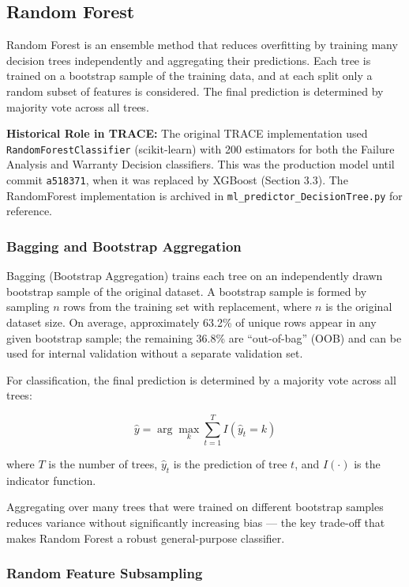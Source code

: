 \documentclass[10pt]{article}
\begin{document}
\subsection{Random Forest}

Random Forest is an ensemble method that reduces overfitting by training many decision trees independently and aggregating their predictions. Each tree is trained on a bootstrap sample of the training data, and at each split only a random subset of features is considered. The final prediction is determined by majority vote across all trees.

\textbf{Historical Role in TRACE:} The original TRACE implementation used \texttt{RandomForestClassifier} (scikit-learn) with 200 estimators for both the Failure Analysis and Warranty Decision classifiers. This was the production model until commit \texttt{a518371}, when it was replaced by XGBoost (Section 3.3). The RandomForest implementation is archived in \texttt{ml\_predictor\_DecisionTree.py} for reference.

\subsubsection{Bagging and Bootstrap Aggregation}

Bagging (Bootstrap Aggregation) trains each tree on an independently drawn bootstrap sample of the original dataset. A bootstrap sample is formed by sampling \(n\) rows from the training set with replacement, where \(n\) is the original dataset size. On average, approximately 63.2\% of unique rows appear in any given bootstrap sample; the remaining 36.8\% are ``out-of-bag'' (OOB) and can be used for internal validation without a separate validation set.

For classification, the final prediction is determined by a majority vote across all trees:

\begin{equation}
\hat{y} = \arg\max_k \sum_{t=1}^{T} I(\hat{y}_t = k)
\end{equation}

where \(T\) is the number of trees, \(\hat{y}_t\) is the prediction of tree \(t\), and \(I(\cdot)\) is the indicator function.

Aggregating over many trees that were trained on different bootstrap samples reduces variance without significantly increasing bias --- the key trade-off that makes Random Forest a robust general-purpose classifier.

\subsubsection{Random Feature Subsampling}
\end{document}

